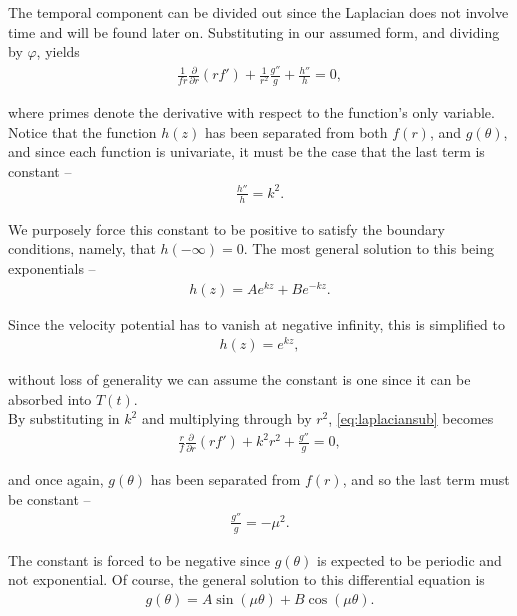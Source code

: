 The temporal component can be divided out since the Laplacian does not involve time and will be found later on. Substituting in our assumed form, and dividing by $\varphi$, yields
\begin{align}
\label{eq:laplaciansub}
\frac{1}{fr}\frac{\partial}{\partial r}(rf') + \frac{1}{r^2}\frac{g''}{g} + \frac{h''}{h} = 0,
\end{align}

where primes denote the derivative with respect to the function's only variable. Notice that the function $h(z)$ has been separated from both $f(r)$, and $g(\theta)$, and since each function is univariate, it must be the case that the last term is constant --
\begin{align*}
\frac{h''}{h} = k^2.
\end{align*}

We purposely force this constant to be positive to satisfy the boundary conditions, namely, that $h(-\infty) = 0$. The most general solution to this being exponentials --
\begin{align*}
h(z) = Ae^{kz} + Be^{-kz}.
\end{align*}

Since the velocity potential has to vanish at negative infinity, this is simplified to
\begin{align}
\label{eq:h}
h(z) = e^{kz},
\end{align}

without loss of generality we can assume the constant is one since it can be absorbed into $T(t)$. \\

By substituting in $k^2$ and multiplying through by $r^2$, \eqref{eq:laplaciansub} becomes
\begin{align}
\label{eq:laplacenoh}
\frac{r}{f}\frac{\partial}{\partial r} \left( rf' \right) + k^2r^2 + \frac{g''}{g} = 0,
\end{align}

and once again, $g(\theta)$ has been separated from $f(r)$, and so the last term must be constant --
\begin{align*}
\frac{g''}{g} = -\mu^2.
\end{align*}

The constant is forced to be negative since $g(\theta)$ is expected to be periodic and not exponential. Of course, the general solution to this differential equation is 
\begin{align*}
g(\theta) = A \sin(\mu \theta) + B \cos(\mu \theta).
\end{align*}

